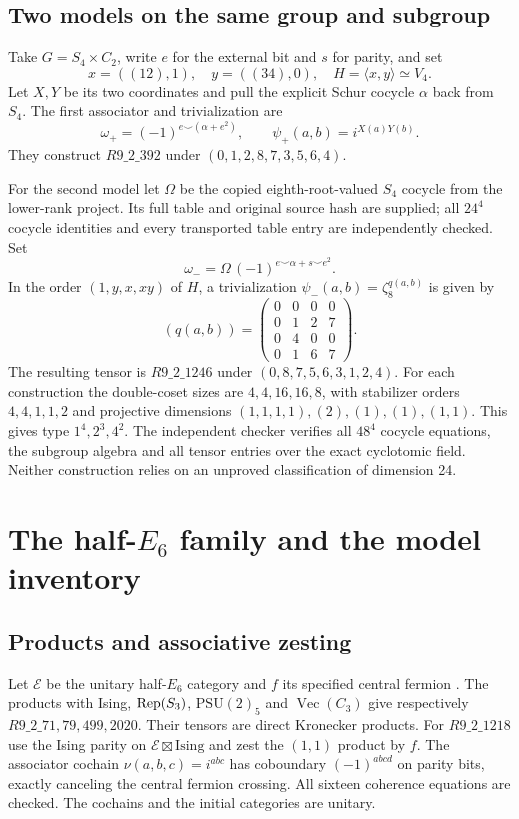 \documentclass[11pt,a4paper]{article}
\theoremstyle{remark}\newtheorem{remark}[theorem]{Remark}
\renewcommand{\Vec}{\operatorname{Vec}}\newcommand{\Irr}{\operatorname{Irr}}
\begin{document}
\subsection{Two models on the same group and subgroup}
Take $G=S_4\times C_2$, write $e$ for the external bit and $s$ for parity,
and set
\[
 x=((12),1),\quad y=((34),0),\quad H=\langle x,y\rangle\simeq V_4.
\]
Let $X,Y$ be its two coordinates and pull the explicit Schur cocycle
$\alpha$ back from $S_4$. The first associator and trivialization are
\[
 \omega_+=(-1)^{e\smile(\alpha+e^2)},\qquad
 \psi_+(a,b)=i^{X(a)Y(b)}.
\]
They construct $R9\_2\_392$ under $(0,1,2,8,7,3,5,6,4)$.

For the second model let $\Omega$ be the copied eighth-root-valued
$S_4$ cocycle from the lower-rank project. Its full table and original
source hash are supplied; all $24^4$ cocycle identities and every
transported table entry are independently checked. Set
\[
 \omega_- =\Omega\,(-1)^{e\smile\alpha+s\smile e^2}.
\]
In the order $(1,y,x,xy)$ of $H$, a trivialization
$\psi_-(a,b)=\zeta_8^{q(a,b)}$ is given by
\[
 (q(a,b))=\begin{pmatrix}0&0&0&0\\0&1&2&7\\0&4&0&0\\0&1&6&7\end{pmatrix}.
\]
The resulting tensor is $R9\_2\_1246$ under $(0,8,7,5,6,3,1,2,4)$.
For each construction the double-coset sizes are $4,4,16,16,8$, with
stabilizer orders $4,4,1,1,2$ and projective dimensions
$(1,1,1,1),(2),(1),(1),(1,1)$. This gives type $1^4,2^3,4^2$.
The independent checker verifies all $48^4$ cocycle equations, the
subgroup algebra and all tensor entries over the exact cyclotomic field.
Neither construction relies on an unproved classification of dimension 24.

\section{The half-\texorpdfstring{$E_6$}{E6} family and the model inventory}
\subsection{Products and associative zesting}
Let $\mathcal E$ be the unitary half-$E_6$ category and $f$ its specified
central fermion \cite{ALW}. The products with Ising, $\operatorname{Rep}(S_3)$,
$\mathrm{PSU}(2)_5$ and $\Vec(C_3)$ give respectively
$R9\_2\_71,79,499,2020$. Their tensors are direct Kronecker products.
For $R9\_2\_1218$ use the Ising parity on $\mathcal E\boxtimes\mathrm{Ising}$
and zest the $(1,1)$ product by $f$. The associator cochain
$\nu(a,b,c)=i^{abc}$ has coboundary $(-1)^{abcd}$ on parity bits, exactly
canceling the central fermion crossing. All sixteen coherence equations
are checked. The cochains and the initial categories are unitary.
\end{document}
